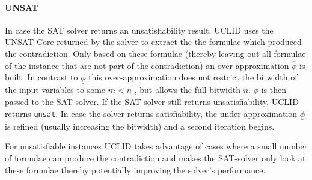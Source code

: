 \paragraph{UNSAT} In case the SAT solver returns an unsatisfiability result, \textsc{UCLID} uses the UNSAT-Core returned by the solver to extract the the formulae which produced the contradiction. Only based on these formulae (thereby leaving out all formulae of the instance that are not part of the contradiction) an over-approximation $\overline{\phi}$ is built. In contrast to $\underline{\phi}$ this over-approximation does not restrict the bitwidth of the input variables to some $m<n$ , but allows the full bitwidth $n$. $\overline{\phi}$ is then passed to the SAT solver. If the SAT solver still returns unsatisfiability, \textsc{UCLID} returns \texttt{unsat}. In case the solver returns satisfiability, the under-approximation $\underline{\phi}$ is refined (usually increasing the bitwidth) and a second iteration begins.
\par
For unsatisfiable instances \textsc{UCLID} takes advantage of cases where a small number of formulae can produce the contradiction and makes the SAT-solver only look at these formulae thereby potentially improving the solver's performance.
